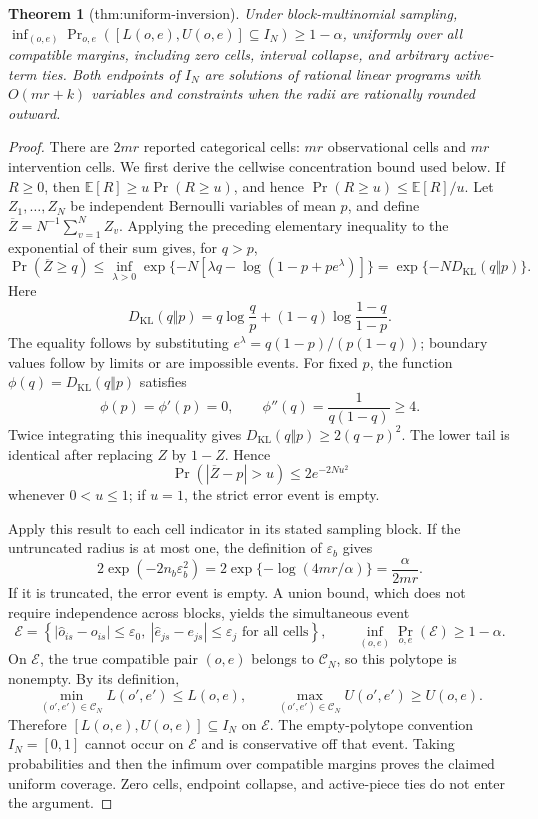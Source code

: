 \documentclass{article}
\newtheorem{theorem}{Theorem}
\begin{document}
\begin{theorem}[thm:uniform-inversion]\label{thm:uniform-inversion}
Under block-multinomial sampling, \(\inf_{(o,e)}\Pr_{o,e}([L(o,e),U(o,e)]\subseteq I_N)\geq1-\alpha\), uniformly over all compatible margins, including zero cells, interval collapse, and arbitrary active-term ties. Both endpoints of \(I_N\) are solutions of rational linear programs with \(O(mr+k)\) variables and constraints when the radii are rationally rounded outward.
\end{theorem}
\begin{proof}
There are \(2mr\) reported categorical cells: \(mr\) observational cells and \(mr\) intervention cells.  We first derive the cellwise concentration bound used below.  If \(R\geq0\), then \(\mathbb E[R]\geq u\Pr(R\geq u)\), and hence \(\Pr(R\geq u)\leq\mathbb E[R]/u\).  Let \(Z_1,\ldots,Z_N\) be independent Bernoulli variables of mean \(p\), and define \(\overline Z=N^{-1}\sum_{v=1}^N Z_v\).  Applying the preceding elementary inequality to the exponential of their sum gives, for \(q>p\),
\[
 \Pr(\overline Z\geq q)
 \leq\inf_{\lambda>0}
 \exp\{-N[\lambda q-\log(1-p+pe^\lambda)]\}
 =\exp\{-N D_{\mathrm{KL}}(q\Vert p)\}.
\]
Here
\[
 D_{\mathrm{KL}}(q\Vert p)
 =q\log\frac{q}{p}+(1-q)\log\frac{1-q}{1-p}.
\]
The equality follows by substituting \(e^\lambda=q(1-p)/(p(1-q))\); boundary values follow by limits or are impossible events.  For fixed \(p\), the function \(\phi(q)=D_{\mathrm{KL}}(q\Vert p)\) satisfies
\[
 \phi(p)=\phi'(p)=0,
 \qquad \phi''(q)=\frac{1}{q(1-q)}\geq4.
\]
Twice integrating this inequality gives \(D_{\mathrm{KL}}(q\Vert p)\geq2(q-p)^2\).  The lower tail is identical after replacing \(Z\) by \(1-Z\).  Hence
\[
 \Pr(|\overline Z-p|>u)\leq2e^{-2Nu^2}
\]
whenever \(0<u\leq1\); if \(u=1\), the strict error event is empty.

Apply this result to each cell indicator in its stated sampling block.  If the untruncated radius is at most one, the definition of \(\varepsilon_b\) gives
\[
 2\exp(-2n_b\varepsilon_b^2)
 =2\exp\{-\log(4mr/\alpha)\}
 =\frac{\alpha}{2mr}.
\]
If it is truncated, the error event is empty.  A union bound, which does not require independence across blocks, yields the simultaneous event
\[
 \mathcal E=\left\{|\widehat o_{is}-o_{is}|\leq\varepsilon_0,
 \ |\widehat e_{js}-e_{js}|\leq\varepsilon_j
 \text{ for all cells}\right\},
 \qquad \inf_{(o,e)}\Pr_{o,e}(\mathcal E)\geq1-\alpha.
\]
On \(\mathcal E\), the true compatible pair \((o,e)\) belongs to \(\mathcal C_N\), so this polytope is nonempty.  By its definition,
\[
 \min_{(o',e')\in\mathcal C_N}L(o',e')\leq L(o,e),
 \qquad
 \max_{(o',e')\in\mathcal C_N}U(o',e')\geq U(o,e).
\]
Therefore \([L(o,e),U(o,e)]\subseteq I_N\) on \(\mathcal E\).  The empty-polytope convention \(I_N=[0,1]\) cannot occur on \(\mathcal E\) and is conservative off that event.  Taking probabilities and then the infimum over compatible margins proves the claimed uniform coverage.  Zero cells, endpoint collapse, and active-piece ties do not enter the argument.


\end{proof}
\end{document}

